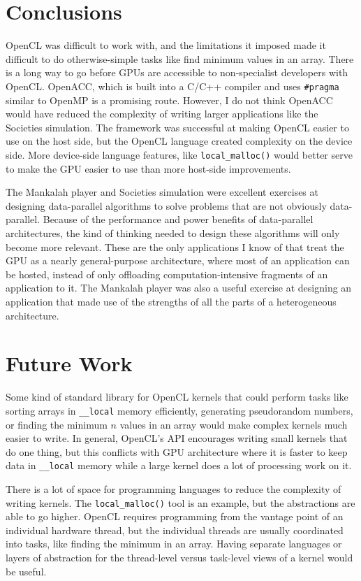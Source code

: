 \documentclass{article}
\begin{document}
\section{Conclusions}
OpenCL was difficult to work with, and the limitations it imposed made it difficult to do otherwise-simple tasks like find minimum values in an array. There is a long way to go before GPUs are accessible to non-specialist developers with OpenCL. OpenACC, which is built into a C/C++ compiler and uses \texttt{\#pragma} similar to OpenMP is a promising route. However, I do not think OpenACC would have reduced the complexity of writing larger applications like the Societies simulation. The framework was successful at making OpenCL easier to use on the host side, but the OpenCL language created complexity on the device side. More device-side language features, like \texttt{local\_malloc()} would better serve to make the GPU easier to use than more host-side improvements.

The Mankalah player and Societies simulation were excellent exercises at designing data-parallel algorithms to solve problems that are not obviously data-parallel. Because of the performance and power benefits of data-parallel architectures, the kind of thinking needed to design these algorithms will only become more relevant. These are the only applications I know of that treat the GPU as a nearly general-purpose architecture, where most of an application can be hosted, instead of only offloading computation-intensive fragments of an application to it. The Mankalah player was also a useful exercise at designing an application that made use of the strengths of all the parts of a heterogeneous architecture. 

\section{Future Work}
Some kind of standard library for OpenCL kernels that could perform tasks like sorting arrays in \texttt{\_\_local} memory efficiently, generating pseudorandom numbers, or finding the minimum $n$ values in an array would make complex kernels much easier to write. In general, OpenCL's API encourages writing small kernels that do one thing, but this conflicts with GPU architecture where it is faster to keep data in \texttt{\_\_local} memory while a large kernel does a lot of processing work on it.

There is a lot of space for programming languages to reduce the complexity of writing kernels. The \texttt{local\_malloc()} tool is an example, but the abstractions are able to go higher. OpenCL requires programming from the vantage point of an individual hardware thread, but the individual threads are usually coordinated into tasks, like finding the minimum in an array. Having separate languages or layers of abstraction for the thread-level versus task-level views of a kernel would be useful.
\end{document}

